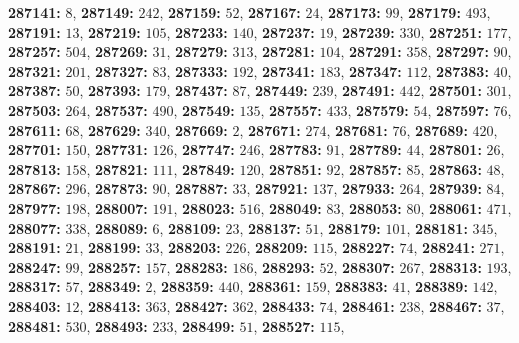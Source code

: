 \textsf{\bfseries 287141:} $8$, \textsf{\bfseries 287149:} $242$, \textsf{\bfseries 287159:} $52$, \textsf{\bfseries 287167:} $24$, \textsf{\bfseries 287173:} $99$, \textsf{\bfseries 287179:} $493$, \textsf{\bfseries 287191:} $13$, \textsf{\bfseries 287219:} $105$, \textsf{\bfseries 287233:} $140$, \textsf{\bfseries 287237:} $19$, \textsf{\bfseries 287239:} $330$, \textsf{\bfseries 287251:} $177$, \textsf{\bfseries 287257:} $504$, \textsf{\bfseries 287269:} $31$, \textsf{\bfseries 287279:} $313$, \textsf{\bfseries 287281:} $104$, \textsf{\bfseries 287291:} $358$, \textsf{\bfseries 287297:} $90$, \textsf{\bfseries 287321:} $201$, \textsf{\bfseries 287327:} $83$, \textsf{\bfseries 287333:} $192$, \textsf{\bfseries 287341:} $183$, \textsf{\bfseries 287347:} $112$, \textsf{\bfseries 287383:} $40$, \textsf{\bfseries 287387:} $50$, \textsf{\bfseries 287393:} $179$, \textsf{\bfseries 287437:} $87$, \textsf{\bfseries 287449:} $239$, \textsf{\bfseries 287491:} $442$, \textsf{\bfseries 287501:} $301$, \textsf{\bfseries 287503:} $264$, \textsf{\bfseries 287537:} $490$, \textsf{\bfseries 287549:} $135$, \textsf{\bfseries 287557:} $433$, \textsf{\bfseries 287579:} $54$, \textsf{\bfseries 287597:} $76$, \textsf{\bfseries 287611:} $68$, \textsf{\bfseries 287629:} $340$, \textsf{\bfseries 287669:} $2$, \textsf{\bfseries 287671:} $274$, \textsf{\bfseries 287681:} $76$, \textsf{\bfseries 287689:} $420$, \textsf{\bfseries 287701:} $150$, \textsf{\bfseries 287731:} $126$, \textsf{\bfseries 287747:} $246$, \textsf{\bfseries 287783:} $91$, \textsf{\bfseries 287789:} $44$, \textsf{\bfseries 287801:} $26$, \textsf{\bfseries 287813:} $158$, \textsf{\bfseries 287821:} $111$, \textsf{\bfseries 287849:} $120$, \textsf{\bfseries 287851:} $92$, \textsf{\bfseries 287857:} $85$, \textsf{\bfseries 287863:} $48$, \textsf{\bfseries 287867:} $296$, \textsf{\bfseries 287873:} $90$, \textsf{\bfseries 287887:} $33$, \textsf{\bfseries 287921:} $137$, \textsf{\bfseries 287933:} $264$, \textsf{\bfseries 287939:} $84$, \textsf{\bfseries 287977:} $198$, \textsf{\bfseries 288007:} $191$, \textsf{\bfseries 288023:} $516$, \textsf{\bfseries 288049:} $83$, \textsf{\bfseries 288053:} $80$, \textsf{\bfseries 288061:} $471$, \textsf{\bfseries 288077:} $338$, \textsf{\bfseries 288089:} $6$, \textsf{\bfseries 288109:} $23$, \textsf{\bfseries 288137:} $51$, \textsf{\bfseries 288179:} $101$, \textsf{\bfseries 288181:} $345$, \textsf{\bfseries 288191:} $21$, \textsf{\bfseries 288199:} $33$, \textsf{\bfseries 288203:} $226$, \textsf{\bfseries 288209:} $115$, \textsf{\bfseries 288227:} $74$, \textsf{\bfseries 288241:} $271$, \textsf{\bfseries 288247:} $99$, \textsf{\bfseries 288257:} $157$, \textsf{\bfseries 288283:} $186$, \textsf{\bfseries 288293:} $52$, \textsf{\bfseries 288307:} $267$, \textsf{\bfseries 288313:} $193$, \textsf{\bfseries 288317:} $57$, \textsf{\bfseries 288349:} $2$, \textsf{\bfseries 288359:} $440$, \textsf{\bfseries 288361:} $159$, \textsf{\bfseries 288383:} $41$, \textsf{\bfseries 288389:} $142$, \textsf{\bfseries 288403:} $12$, \textsf{\bfseries 288413:} $363$, \textsf{\bfseries 288427:} $362$, \textsf{\bfseries 288433:} $74$, \textsf{\bfseries 288461:} $238$, \textsf{\bfseries 288467:} $37$, \textsf{\bfseries 288481:} $530$, \textsf{\bfseries 288493:} $233$, \textsf{\bfseries 288499:} $51$, \textsf{\bfseries 288527:} $115$, 
